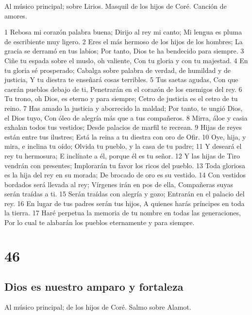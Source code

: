 Al músico principal; sobre Lirios. Masquil de los hijos de Coré. Canción de amores.

1 Rebosa mi corazón palabra buena;
Dirijo al rey mi canto;
Mi lengua es pluma de escribiente muy ligero.
2 Eres el más hermoso de los hijos de los hombres;
La gracia se derramó en tus labios;
Por tanto, Dios te ha bendecido para siempre.
3 Ciñe tu espada sobre el muslo, oh valiente,
Con tu gloria y con tu majestad.
4 En tu gloria sé prosperado;
Cabalga sobre palabra de verdad, de humildad y de justicia,
Y tu diestra te enseñará cosas terribles.
5 Tus saetas agudas,
Con que caerán pueblos debajo de ti,
Penetrarán en el corazón de los enemigos del rey.
6 Tu trono, oh Dios, es eterno y para siempre;
Cetro de justicia es el cetro de tu reino.
7 Has amado la justicia y aborrecido la maldad;
Por tanto, te ungió Dios, el Dios tuyo,
Con óleo de alegría más que a tus compañeros.
8 Mirra, áloe y casia exhalan todos tus vestidos;
Desde palacios de marfil te recrean.
9 Hijas de reyes están entre tus ilustres;
Está la reina a tu diestra con oro de Ofir.
10 Oye, hija, y mira, e inclina tu oído;
Olvida tu pueblo, y la casa de tu padre;
11 Y deseará el rey tu hermosura;
E inclínate a él, porque él es tu señor.
12 Y las hijas de Tiro vendrán con presentes;
Implorarán tu favor los ricos del pueblo.
13 Toda gloriosa es la hija del rey en su morada;
De brocado de oro es su vestido.
14 Con vestidos bordados será llevada al rey;
Vírgenes irán en pos de ella,
Compañeras suyas serán traídas a ti.
15 Serán traídas con alegría y gozo;
Entrarán en el palacio del rey.
16 En lugar de tus padres serán tus hijos,
A quienes harás príncipes en toda la tierra.
17 Haré perpetua la memoria de tu nombre en todas las generaciones,
Por lo cual te alabarán los pueblos eternamente y para siempre.

\chapter{46}

\section*{Dios es nuestro amparo y fortaleza}

Al músico principal; de los hijos de Coré. Salmo sobre Alamot.

